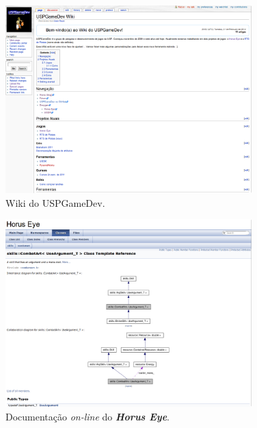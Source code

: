 \documentclass[12pt,onecolumn,a4paper]{article}
\begin{document}
        \begin{figure}[htb]
            \centering
            \includegraphics[width=0.85\textwidth]{images/site_03.png}
            \caption{Wiki do USPGameDev.}
            \label{fig:site_03}
        \end{figure}
        
        \clearpage
        
        \begin{figure}[htb]
            \centering
            \includegraphics[width=0.85\textwidth]{images/site_04.png}
            \caption{Documentação \textit{on-line} do \textit{\textbf{Horus Eye}}.}
            \label{fig:site_04}
        \end{figure}
    
        
\end{document}
